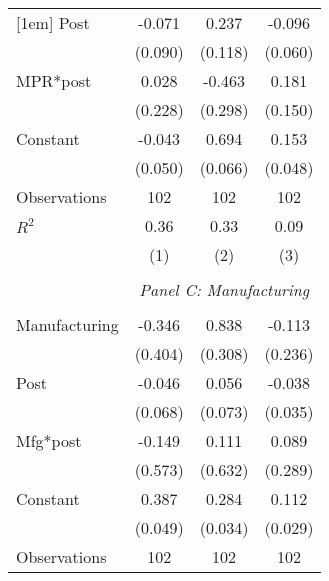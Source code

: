\begin{table}[!htbp]
\begin{tabular}{@{\extracolsep{5pt}}lccc}
[1em]
Post                &      -0.071         &       0.237\sym{**} &      -0.096         \\
                    &     (0.090)         &     (0.118)         &     (0.060)         \\
[1em]
MPR*post            &       0.028         &      -0.463         &       0.181         \\
                    &     (0.228)         &     (0.298)         &     (0.150)         \\
[1em]
Constant            &      -0.043         &       0.694\sym{***}&       0.153\sym{***}\\
                    &     (0.050)         &     (0.066)         &     (0.048)         \\
[1em]
Observations        &         102         &         102         &         102         \\
\(R^{2}\)           &        0.36         &        0.33         &        0.09         \\
                    &\multicolumn{1}{c}{(1)}         &\multicolumn{1}{c}{(2)}         &\multicolumn{1}{c}{(3)}         \\
\hline \\               & \multicolumn{3}{c}{\textit{Panel C: Manufacturing}} \\               \addlinespace[1mm] \\
Manufacturing       &      -0.346         &       0.838\sym{***}&      -0.113         \\
        &     (0.404)         &     (0.308)         &     (0.236)         \\
[1em]
Post                &      -0.046         &       0.056         &      -0.038         \\
                    &     (0.068)         &     (0.073)         &     (0.035)         \\
[1em]
Mfg*post            &      -0.149         &       0.111         &       0.089         \\
                    &     (0.573)         &     (0.632)         &     (0.289)         \\
[1em]
Constant            &       0.387\sym{***}&       0.284\sym{***}&       0.112\sym{***}\\
                    &     (0.049)         &     (0.034)         &     (0.029)         \\
[1em]
Observations        &         102         &         102         &         102         \\

\end{tabular}
\end{table}
